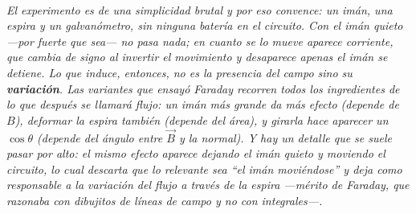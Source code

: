 \begin{center}
\begin{tikzpicture}[scale=1]
\end{tikzpicture}\\[0.5em]
{\small\itshape El experimento es de una simplicidad brutal y por eso convence:
un imán, una espira y un galvanómetro, sin ninguna batería en el circuito. Con
el imán quieto ---por fuerte que sea--- no pasa nada; en cuanto se lo mueve
aparece corriente, que cambia de signo al invertir el movimiento y desaparece
apenas el imán se detiene. Lo que induce, entonces, no es la \emph{presencia}
del campo sino su \textbf{variación}. Las variantes que ensayó Faraday recorren
todos los ingredientes de lo que después se llamará flujo: un imán más grande da
más efecto (depende de $B$), deformar la espira también (depende del área), y
girarla hace aparecer un $\cos\theta$ (depende del ángulo entre $\vec B$ y la
normal). Y hay un detalle que se suele pasar por alto: el mismo efecto aparece
dejando el imán quieto y moviendo el circuito, lo cual descarta que lo relevante
sea ``el imán moviéndose'' y deja como responsable a la variación del flujo a
través de la espira ---mérito de Faraday, que razonaba con dibujitos de líneas
de campo y no con integrales---.}
\end{center}
